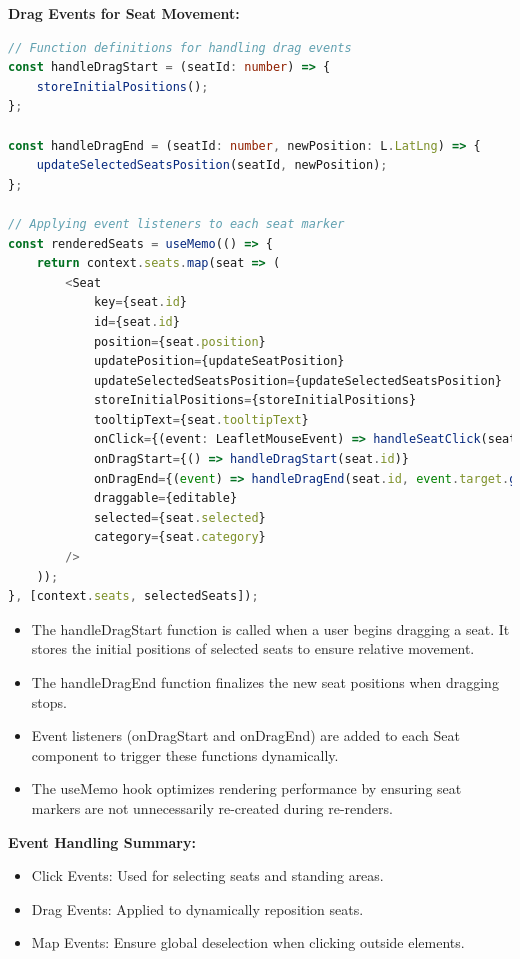 \textbf{Drag Events for Seat Movement:}
\begin{lstlisting}[language=TypeScript, caption=Handling Seat Drag Events, label=lst:leaflet-seat-drag]
// Function definitions for handling drag events
const handleDragStart = (seatId: number) => {
    storeInitialPositions();
};

const handleDragEnd = (seatId: number, newPosition: L.LatLng) => {
    updateSelectedSeatsPosition(seatId, newPosition);
};

// Applying event listeners to each seat marker
const renderedSeats = useMemo(() => {
    return context.seats.map(seat => (
        <Seat 
            key={seat.id} 
            id={seat.id}
            position={seat.position} 
            updatePosition={updateSeatPosition}
            updateSelectedSeatsPosition={updateSelectedSeatsPosition}
            storeInitialPositions={storeInitialPositions} 
            tooltipText={seat.tooltipText}
            onClick={(event: LeafletMouseEvent) => handleSeatClick(seat.id, event)}
            onDragStart={() => handleDragStart(seat.id)}
            onDragEnd={(event) => handleDragEnd(seat.id, event.target.getLatLng())}
            draggable={editable}
            selected={seat.selected}
            category={seat.category}
        />
    ));
}, [context.seats, selectedSeats]);
\end{lstlisting}

\begin{itemize}
    \item The handleDragStart function is called when a user begins dragging a seat. It stores the initial positions of selected seats to ensure relative movement.
    \item The handleDragEnd function finalizes the new seat positions when dragging stops.
    \item Event listeners (onDragStart and onDragEnd) are added to each Seat component to trigger these functions dynamically.
    \item The useMemo hook optimizes rendering performance by ensuring seat markers are not unnecessarily re-created during re-renders.
\end{itemize}

\textbf{Event Handling Summary:}
\begin{itemize}
    \item Click Events: Used for selecting seats and standing areas.
    \item Drag Events: Applied to dynamically reposition seats.
    \item Map Events: Ensure global deselection when clicking outside elements.
\end{itemize}

